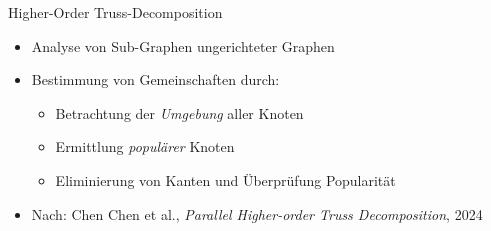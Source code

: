 \begin{frame}{Higher-Order Truss-Decomposition}
    \begin{itemize}
        \item Analyse von Sub-Graphen ungerichteter Graphen
        \item Bestimmung von Gemeinschaften durch:
        \begin{itemize}
            \item Betrachtung der \textit{Umgebung} aller Knoten
            \item Ermittlung \textit{populärer} Knoten
            \item Eliminierung von Kanten und Überprüfung Popularität
        \end{itemize}
        \item Nach: Chen Chen et al., \textit{Parallel Higher-order Truss Decomposition}, 2024 \cite{chen2024parallelhigherordertrussdecomposition}
    \end{itemize}
\end{frame}

